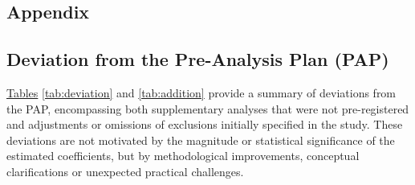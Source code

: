 \documentclass[a4paper,12pt]{article}
\begin{document}
	
	\begin{appendix}




\onehalfspacing

\section{Appendix}


\subsection{Deviation from the Pre-Analysis Plan (PAP)} \label{A1 Dev from PAP}

\noindent \hyperref[tab:deviation]{Tables} \ref{tab:deviation} and \ref{tab:addition} provide a summary of deviations from the PAP, encompassing both supplementary analyses that were not pre-registered and adjustments or omissions of exclusions initially specified in the study.  These deviations are not motivated by the magnitude or statistical significance of the estimated coefficients, but by methodological improvements, conceptual clarifications or unexpected practical challenges.\\




\singlespacing


\end{appendix}
\end{document}
